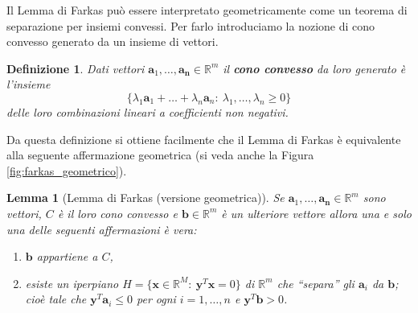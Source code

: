 \documentclass[italian, letter paper, 12pt, reqno]{article}
\theoremstyle{myteo}
\newtheorem{lemma}[theorem]{Lemma}
\newtheorem{definition}[theorem]{Definizione}
\numberwithin{equation}{section}
\begin{document}
Il Lemma di Farkas può essere interpretato geometricamente come un teorema di separazione per insiemi convessi.
Per farlo introduciamo la nozione di cono convesso generato da un insieme di vettori.

\begin{definition}
  \label{def:cono_convesso}
  Dati vettori \(\mathbf{a}_1,\ldots,\mathbf{a_n}\in\mathbb{R}^m\) il \textbf{cono convesso} da loro generato è l'insieme
  \[\big\{\lambda_1\mathbf{a}_1+\ldots+\lambda_n\mathbf{a}_n\colon\ \lambda_1,\ldots,\lambda_n \geq 0\big\}\]
  delle loro combinazioni lineari a coefficienti non negativi.
\end{definition}

Da questa definizione si ottiene facilmente che il Lemma di Farkas è equivalente alla seguente affermazione geometrica (si veda anche la Figura \ref{fig:farkas_geometrico}).

\begin{lemma}[Lemma di Farkas (versione geometrica)]
  \label{lemma:farkas_geometrico}
  Se \(\mathbf{a}_1,\ldots,\mathbf{a_n}\in\mathbb{R}^m\) sono vettori, \(C\) è il loro cono convesso e \(\mathbf{b}\in\mathbb{R}^m\) è un ulteriore vettore allora una e solo una delle seguenti affermazioni è vera:
  \begin{enumerate}
  \item \(\mathbf{b}\) appartiene a \(C\),
  \item esiste un iperpiano \(H=\{\mathbf{x}\in\mathbb{R}^M\colon\ \mathbf{y}^T\mathbf{x} = 0\}\) di \(\mathbb{R}^m\) che ``separa'' gli \(\mathbf{a}_i\) da \(\mathbf{b}\); cioè tale che \(\mathbf{y}^T\mathbf{a}_i \leq 0\) per ogni \(i=1,\ldots, n\) e \(\mathbf{y}^T\mathbf{b} > 0\).
  \end{enumerate}
\end{lemma}
\end{document}
